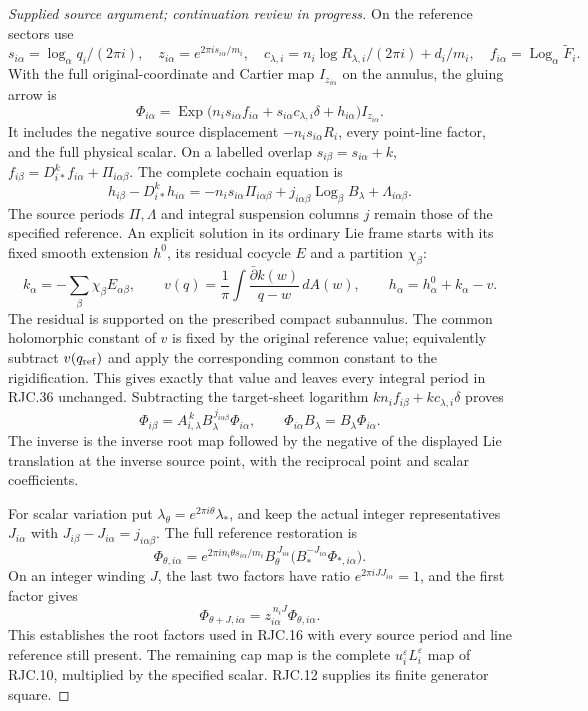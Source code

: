 \begin{proof}[Supplied source argument; continuation review in progress]
On the reference sectors use
\[
 s_{i\alpha}=\log_\alpha q_i/(2\pi i),\quad
 z_{i\alpha}=e^{2\pi i s_{i\alpha}/m_i},\quad
 c_{\lambda,i}=
 n_i\log R_{\lambda,i}/(2\pi i)+d_i/m_i,\quad
 f_{i\alpha}=\operatorname{Log}_\alpha\widetilde F_i.
 \tag{RJC.34}
\]
With the full original-coordinate and Cartier map \(I_{z_{i\alpha}}\)
on the annulus, the gluing arrow is
\[
 \Phi_{i\alpha}=
 \operatorname{Exp}
 \bigl(n_i s_{i\alpha}f_{i\alpha}
       +s_{i\alpha}c_{\lambda,i}\delta+h_{i\alpha}\bigr)
 I_{z_{i\alpha}}.
 \tag{RJC.35}
\]
It includes the negative source displacement
\(-n_i s_{i\alpha}R_i\), every point-line factor, and the full
physical scalar. On a labelled overlap
\(s_{i\beta}=s_{i\alpha}+k\),
\(f_{i\beta}=D_{i*}^kf_{i\alpha}+\Pi_{i\alpha\beta}\).
The complete cochain equation is
\[
 h_{i\beta}-D_{i*}^k h_{i\alpha}
 =-n_i s_{i\alpha}\Pi_{i\alpha\beta}
  +j_{i\alpha\beta}\operatorname{Log}_\beta B_\lambda
  +\Lambda_{i\alpha\beta}.
 \tag{RJC.36}
\]
The source periods \(\Pi,\Lambda\) and integral suspension
columns \(j\) remain those of the specified reference.
An explicit solution in its ordinary Lie frame starts with its
fixed smooth extension \(h^0\), its residual cocycle \(E\) and
a partition \(\chi_\beta\):
\[
 k_\alpha=-\sum_\beta\chi_\beta E_{\alpha\beta},\qquad
 v(q)=\frac1\pi\int
 \frac{\bar\partial k(w)}{q-w}\,dA(w),\qquad
 h_\alpha=h_\alpha^0+k_\alpha-v.
 \tag{RJC.37}
\]
The residual is supported on the prescribed compact subannulus.
The common holomorphic constant of \(v\) is fixed by the original
reference value; equivalently subtract \(v(q_{\rm ref})\) and
apply the corresponding common constant to the rigidification.
This gives exactly that value and leaves every integral period
in RJC.36 unchanged. Subtracting the target-sheet logarithm
\(kn_i f_{i\beta}+kc_{\lambda,i}\delta\) proves
\[
 \Phi_{i\beta}=
 A_{i,\lambda}^{\,k}B_\lambda^{\,j_{i\alpha\beta}}\Phi_{i\alpha},
 \qquad
 \Phi_{i\alpha}B_\lambda=B_\lambda\Phi_{i\alpha}.
 \tag{RJC.38}
\]
The inverse is the inverse root map followed by the negative
of the displayed Lie translation at the inverse source point,
with the reciprocal point and scalar coefficients.

For scalar variation put
\(\lambda_\theta=e^{2\pi i\theta}\lambda_*\), and keep the
actual integer representatives \(J_{i\alpha}\) with
\(J_{i\beta}-J_{i\alpha}=j_{i\alpha\beta}\).
The full reference restoration is
\[
 \Phi_{\theta,i\alpha}
 =e^{2\pi i n_i\theta s_{i\alpha}/m_i}
 B_\theta^{\,J_{i\alpha}}
 \bigl(B_*^{-J_{i\alpha}}\Phi_{*,i\alpha}\bigr).
 \tag{RJC.39}
\]
On an integer winding \(J\), the last two factors have ratio
\(e^{2\pi iJ J_{i\alpha}}=1\), and the first factor gives
\[
 \Phi_{\theta+J,i\alpha}
 =z_{i\alpha}^{\,n_iJ}\Phi_{\theta,i\alpha}.
 \tag{RJC.40}
\]
This establishes the root factors used in RJC.16 with every
source period and line reference still present. The remaining
cap map is the complete \(u_i^\varepsilon L_i^\varepsilon\)
map of RJC.10, multiplied by the specified scalar.
RJC.12 supplies its finite generator square.


\end{proof}
